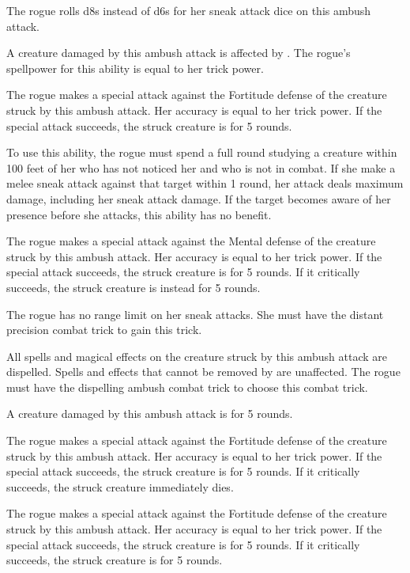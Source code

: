 The rogue rolls d8s instead of d6s for her sneak attack dice on this ambush attack.

A creature damaged by this ambush attack is affected by .
The rogue's spellpower for this ability is equal to her trick power.

The rogue makes a special attack against the Fortitude defense of the creature struck by this ambush attack.
Her accuracy is equal to her trick power.
If the special attack succeeds, the struck creature is \staggered for 5 rounds.

To use this ability, the rogue must spend a full round studying a creature within 100 feet of her who has not noticed her and who is not in combat.
If she make a melee sneak attack against that target within 1 round, her attack deals maximum damage, including her sneak attack damage.
If the target becomes aware of her presence before she attacks, this ability has no benefit.

The rogue makes a special attack against the Mental defense of the creature struck by this ambush attack.
Her accuracy is equal to her trick power.
If the special attack succeeds, the struck creature is \disoriented for 5 rounds.
If it critically succeeds, the struck creature is instead \confused for 5 rounds.

The rogue has no range limit on her sneak attacks.
She must have the distant precision combat trick to gain this trick.

All spells and magical effects on the creature struck by this ambush attack are dispelled.
Spells and effects that cannot be removed by  are unaffected.
The rogue must have the dispelling ambush combat trick to choose this combat trick.

A creature damaged by this ambush attack is \dazed for 5 rounds.

The rogue makes a special attack against the Fortitude defense of the creature struck by this ambush attack.
Her accuracy is equal to her trick power.
If the special attack succeeds, the struck creature is \staggered for 5 rounds.
If it critically succeeds, the struck creature immediately dies.

The rogue makes a special attack against the Fortitude defense of the creature struck by this ambush attack.
Her accuracy is equal to her trick power.
If the special attack succeeds, the struck creature is \staggered for 5 rounds.
If it critically succeeds, the struck creature is \paralyzed for 5 rounds.

